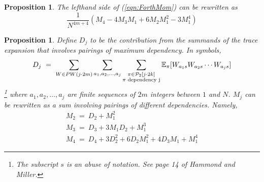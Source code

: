 \documentclass[12pt,reqno]{amsart}
\theoremstyle{plain} %
\newtheorem{prop}[theorem]{Proposition}
\theoremstyle{remark}
\theoremstyle{definition}
\newcommand{\E}{\mathbb E}
\begin{document}
\begin{prop}
    The lefthand side of (\ref{eqn:ForthMom}) can be rewritten as 
    \begin{equation} \label{eqn:binomial}
        \frac 1 {N^{4m + 4}}
        \left(
            M_{4} -4 M_{3} M_1 + 6 M_{2} M_1^2 -3 M_1^4
        \right)
    \end{equation}
\end{prop}
\begin{prop}
    Define $D_j$ to be the contribution from the summands of the trace 
    expansion that involves pairings of maximum dependency. In symbols, 
    \begin{equation}
        D_j \ = \
        \sum_{W \in PW(j\cdot 2m)} 
        \sum_{a_1, a_2, \dots, a_j}
        \sum_{
            \substack{
            \pi \in \mathcal{P}_2[j \cdot 2k]\\
            \pi \textnormal{ dependency j}
            }
        }
\E_\pi[W_{a_1s}W_{a_2s}\cdots W_{a_js}]
    \end{equation}
    \footnote{The subscript $s$ is an abuse of notation. See page 14 of 
    Hammond and Miller.}
    where $a_1, a_2, \dots, a_j$ are finite sequences of $2m$ integers 
    between $1$ and $N$. 
    $M_j$ can be rewritten as a sum involving pairings of different 
    dependencies. Namely, 
    \begin{eqnarray} \label{eqn:MjExpansions}
        M_2 \ = \ D_2 + M_1^2 \nonumber \\
        M_3 \ = \ D_3 + 3M_1D_2 + M_1^3 \nonumber \\
        M_4 \ = \ D_4 + 3D_2^2 + 6 D_2 M_1^2 + 4D_3M_1 + M_1^4 
    \end{eqnarray}
\end{prop}
\end{document}
